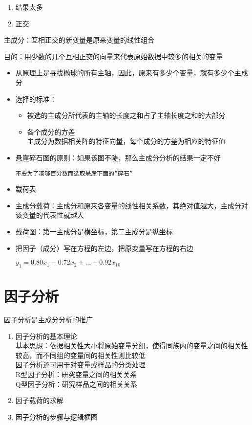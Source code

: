 \documentclass[UTF8,10pt]{book}
\begin{document}
{\begin{enumerate}
	\def\labelenumi{\arabic{enumi}.}
	\item
	结果太多
	\item
	正交
\end{enumerate}

主成分：互相正交的新变量是原来变量的线性组合

目的：用少数的几个互相正交的向量来代表原始数据中较多的相关的变量

\begin{itemize}
	\item
	从原理上是寻找椭球的所有主轴，因此，原来有多少个变量，就有多少个主成分
	\item
	选择的标准：
	
	\begin{itemize}
		\item
		被选的主成分所代表的主轴的长度之和占了主轴长度之和的大部分
		\item
		各个成分的方差\\
		主成分为数据相关阵的特征向量，每个成分的方差为相应的特征值
	\end{itemize}
	\item
	悬崖碎石图的原则：如果该图不陡，那么主成分分析的结果一定不好
	
	\texttt{不要为了凑够百分数而选取悬崖下面的“碎石”} 
	\item
	载荷表
	\item
	主成分载荷：主成分和原来各变量的线性相关系数，其绝对值越大，主成分对该变量的代表性就越大
	\item
	载荷图：第一主成分是横坐标，第二主成分是纵坐标
	\item
	把因子（成分）写在方程的左边，把原变量写在方程的右边
	
	\( y_1 = 0.80x_1 - 0.72x_2 + ... + 0.92x_{10} \)
\end{itemize}

\section{因子分析}\label{header-n73}

因子分析是主成分分析的推广

\begin{enumerate}
	\def\labelenumi{\arabic{enumi}.}
	\item
	因子分析的基本理论\\
	基本思想：依据相关性大小将原始变量分组，使得同族内的变量之间的相关性较高，而不同组的变量间的相关性则比较低\\
	因子分析还可用于对变量或样品的分类处理\\
	R型因子分析：研究变量之间的相关关系\\
	Q型因子分析：研究样品之间的相关关系
	\item
	因子载荷的求解
	\item
	因子分析的步骤与逻辑框图
\end{enumerate}

}
\end{document}
